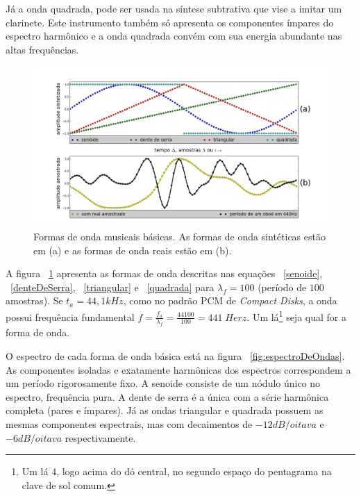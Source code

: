 Já a onda quadrada, pode ser usada na síntese
subtrativa que vise a imitar um clarinete. Este instrumento também só apresenta os
componentes ímpares do espectro harmônico e a onda quadrada convém com sua energia abundante nas altas frequências.



\begin{figure}[h!]
    \centering
        \includegraphics[width=\textwidth]{figuras/formasDeOnda6}
    \caption{Formas de onda musicais básicas. As formas de onda sintéticas estão em (a) e as formas de onda reais estão em (b).}
        \label{fig:formasDeOnda}
\end{figure}



A figura ~\ref{fig:formasDeOnda} apresenta
as formas de onda descritas nas equações ~\ref{senoide}, ~\ref{denteDeSerra}, ~\ref{triangular} e ~\ref{quadrada} para $\lambda_f=100$ (período
de $100$ amostras).
Se $t_a=44,1 kHz$, como no padrão PCM de \emph{Compact Disks}, a onda possui frequência fundamental $f=\frac{f_a}{\lambda_f}=\frac{44100}{100} = 441 \; Herz $. Um lá\footnote{Um lá 4, logo acima do dó central, no segundo espaço do pentagrama na clave de sol comum.} seja qual for a forma de onda.

O espectro de cada forma de onda básica está na figura ~\ref{fig:espectroDeOndas}. As componentes isoladas e exatamente harmônicas dos espectros correspondem a um período rigorosamente fixo. A senoide consiste de um nódulo único no espectro, frequência pura. A dente de serra é a única com a série harmônica completa (pares e ímpares). Já as ondas triangular e quadrada possuem as mesmas componentes espectrais, mas com decaimentos de $-12dB/oitava$ e $-6dB/oitava$ respectivamente.

